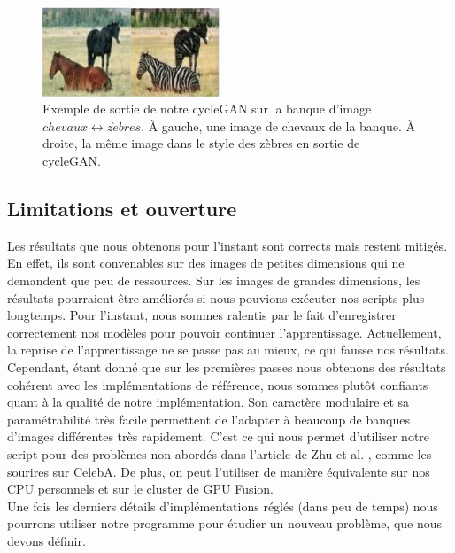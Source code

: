 \begin{figure}[!h]
\centering
\includegraphics[width=150pt]{"images/cycle/cycleRes3"}
\caption{Exemple de sortie de notre cycleGAN sur la banque d'image $chevaux \leftrightarrow z\grave{e}bres$. À gauche, une image de chevaux de la banque. À droite, la même image dans le style des zèbres en sortie de cycleGAN.}
\label{exemple_zebres}
\end{figure}

\subsection{Limitations et ouverture}

Les résultats que nous obtenons pour l'instant sont corrects mais restent mitigés. En effet, ils sont convenables sur des images de petites dimensions qui ne demandent que peu de ressources. Sur les images de grandes dimensions, les résultats pourraient être améliorés si nous pouvions exécuter nos scripts plus longtemps. Pour l'instant, nous sommes ralentis par le fait d'enregistrer correctement nos modèles pour pouvoir continuer l'apprentissage. Actuellement, la reprise de l'apprentissage ne se passe pas au mieux, ce qui fausse nos résultats.\\

Cependant, étant donné que sur les premières passes nous obtenons des résultats cohérent avec les implémentations de référence, nous sommes plutôt confiants quant à la qualité de notre implémentation. Son caractère modulaire et sa paramétrabilité très facile permettent de l'adapter à beaucoup de banques d'images différentes très rapidement. C'est ce qui nous permet d'utiliser notre script pour des problèmes non abordés dans l'article de Zhu et al. \cite{zhu_unpaired_2018}, comme les sourires sur CelebA. De plus, on peut l'utiliser de manière équivalente sur nos CPU personnels et sur le cluster de GPU Fusion.\\

Une fois les derniers détails d'implémentations réglés (dans peu de temps) nous pourrons utiliser notre programme pour étudier un nouveau problème, que nous devons définir.